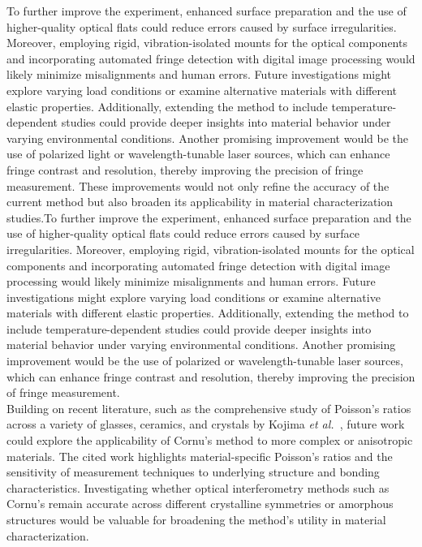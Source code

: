 \documentclass[a4paper,11pt]{article}
\begin{document}
To further improve the experiment, enhanced surface preparation and the use of higher-quality optical flats could reduce errors caused by surface irregularities. Moreover, employing rigid, vibration-isolated mounts for the optical components and incorporating automated fringe detection with digital image processing would likely minimize misalignments and human errors. Future investigations might explore varying load conditions or examine alternative materials with different elastic properties. Additionally, extending the method to include temperature-dependent studies could provide deeper insights into material behavior under varying environmental conditions. Another promising improvement would be the use of polarized light or wavelength-tunable laser sources, which can enhance fringe contrast and resolution, thereby improving the precision of fringe measurement. These improvements would not only refine the accuracy of the current method but also broaden its applicability in material characterization studies.To further improve the experiment, enhanced surface preparation and the use of higher-quality optical flats could reduce errors caused by surface irregularities. Moreover, employing rigid, vibration-isolated mounts for the optical components and incorporating automated fringe detection with digital image processing would likely minimize misalignments and human errors. Future investigations might explore varying load conditions or examine alternative materials with different elastic properties. Additionally, extending the method to include temperature-dependent studies could provide deeper insights into material behavior under varying environmental conditions. Another promising improvement would be the use of polarized or wavelength-tunable laser sources, which can enhance fringe contrast and resolution, thereby improving the precision of fringe measurement.\\

Building on recent literature, such as the comprehensive study of Poisson’s ratios across a variety of glasses, ceramics, and crystals by Kojima \textit{et al.}~\autocite{Kojima2024Poisson}, future work could explore the applicability of Cornu’s method to more complex or anisotropic materials. The cited work highlights material-specific Poisson’s ratios and the sensitivity of measurement techniques to underlying structure and bonding characteristics. Investigating whether optical interferometry methods such as Cornu’s remain accurate across different crystalline symmetries or amorphous structures would be valuable for broadening the method’s utility in material characterization.\\
\end{document}
